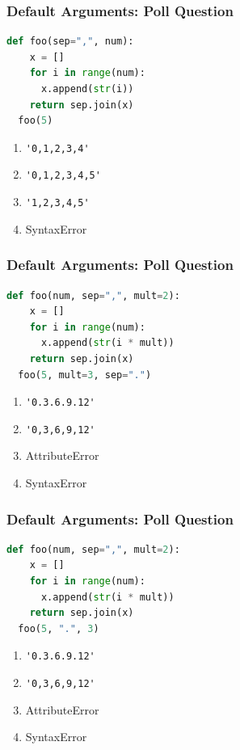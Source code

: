 \documentclass{beamer}
\begin{document}
%
%
\begin{frame}[fragile]
  \frametitle{Default Arguments: Poll Question}
  \begin{lstlisting}[language=Python, autogobble]
  def foo(sep=",", num):
    x = []
    for i in range(num):
      x.append(str(i))
    return sep.join(x)
  foo(5)
  \end{lstlisting}
  \vfill
  \begin{enumerate}[A]
    \item \lstinline|'0,1,2,3,4'|
    \item \lstinline|'0,1,2,3,4,5'|
    \item \lstinline|'1,2,3,4,5'|
    \item SyntaxError
  \end{enumerate}
\end{frame}

%
%
\begin{frame}[fragile]
  \frametitle{Default Arguments: Poll Question}
  \begin{lstlisting}[language=Python, autogobble]
  def foo(num, sep=",", mult=2):
    x = []
    for i in range(num):
      x.append(str(i * mult))
    return sep.join(x)
  foo(5, mult=3, sep=".")
  \end{lstlisting}
  \vfill
  \begin{enumerate}[A]
    \item \lstinline|'0.3.6.9.12'|
    \item \lstinline|'0,3,6,9,12'|
    \item AttributeError
    \item SyntaxError
  \end{enumerate}
\end{frame}

%
%
\begin{frame}[fragile]
  \frametitle{Default Arguments: Poll Question}
  \begin{lstlisting}[language=Python, autogobble]
  def foo(num, sep=",", mult=2):
    x = []
    for i in range(num):
      x.append(str(i * mult))
    return sep.join(x)
  foo(5, ".", 3)
  \end{lstlisting}
  \vfill
  \begin{enumerate}[A]
    \item \lstinline|'0.3.6.9.12'|
    \item \lstinline|'0,3,6,9,12'|
    \item AttributeError
    \item SyntaxError
  \end{enumerate}
\end{frame}
\end{document}
